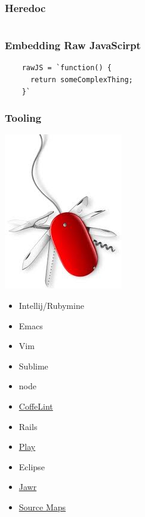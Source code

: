 \documentclass{beamer}
\begin{document}
\begin{frame}
  \frametitle{Heredoc}
  \inputminted{coffeescript}{src/heredoc.coffee}
\end{frame}

\begin{frame}[fragile]
  \frametitle{Embedding Raw JavaScirpt}
  \begin{verbatim}
    rawJS = `function() {
      return someComplexThing;
    }`
  \end{verbatim}
\end{frame}


\begin{frame}
  \frametitle{Tooling}
    \includegraphics[scale=.40]{tooling}
  \begin{multicols}{2}
  \begin{itemize}
    \item Intellij/Rubymine
    \item Emacs
    \item Vim
    \item Sublime
    \item node
    \item \href{http://www.coffeelint.org/}{CoffeLint}
    \item Rails
    \item \href{http://www.playframework.com/documentation/2.0/AssetsCoffeeScript}{Play}
    \item Eclipse
    \item \href{https://jawr.java.net/}{Jawr}
    \item
      \href{http://www.html5rocks.com/en/tutorials/developertools/sourcemaps/}{Source
      Maps}

  \end{itemize}
\end{multicols}
\end{frame}
\end{document}
